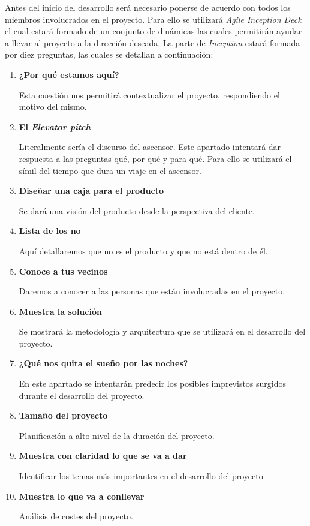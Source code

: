 Antes del inicio del desarrollo será necesario ponerse de acuerdo con todos los miembros involucrados en el proyecto.
Para ello se utilizará \textit{Agile Inception Deck} el cual estará formado de un conjunto de dinámicas las cuales permitirán
ayudar a llevar al proyecto a la dirección deseada. La parte de \textit{Inception} estará formada por diez preguntas, las
cuales se detallan a continuación:

\begin{enumerate}
  \item \textbf{¿Por qué estamos aquí?}

    Esta cuestión nos permitirá contextualizar el proyecto, respondiendo el motivo del mismo.
  \item \textbf{El \textit{Elevator pitch}}

    Literalmente sería el discurso del ascensor. Este apartado intentará dar respuesta a las preguntas qué, por qué y para qué.
    Para ello se utilizará el símil del tiempo que dura un viaje en el ascensor.
  \item \textbf{Diseñar una caja para el producto}

    Se dará una visión del producto desde la perspectiva del cliente.
  \item \textbf{Lista de los no}

    Aquí detallaremos que no es el producto y que no está dentro de él.
  \item \textbf{Conoce a tus vecinos}

    Daremos a conocer a las personas que están involucradas en el proyecto.
  \item \textbf{Muestra la solución}

    Se mostrará la metodología y arquitectura que se utilizará en el desarrollo del proyecto.
  \item \textbf{¿Qué nos quita el sueño por las noches?}

    En este apartado se intentarán predecir los posibles imprevistos surgidos durante
    el desarrollo del proyecto.
  \item \textbf{Tamaño del proyecto}

    Planificación a alto nivel de la duración del proyecto.
  \item \textbf{Muestra con claridad lo que se va a dar}

    Identificar los temas más importantes en el desarrollo del proyecto
  \item \textbf{Muestra lo que va a conllevar}

    Análisis de costes del proyecto.
\end{enumerate}
